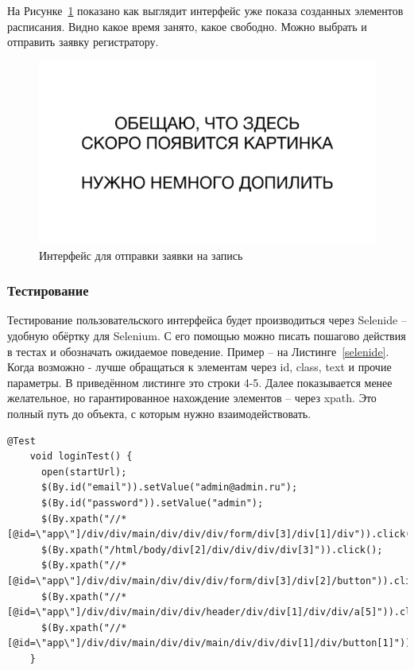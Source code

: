 \documentclass[a4paper,article]{article}
\begin{document}
\begin{sloppypar}
    \newpage
    
    На Рисунке~\ref{fig:dosched} показано как выглядит интерфейс уже показа созданных элементов расписания. Видно какое время занято, какое свободно. Можно выбрать и отправить заявку регистратору.
    
    \begin{figure}[h]
        \centering
        \includegraphics[width=0.8\linewidth]{UI. Доступное для записи время.png}        
        \caption{\centering Интерфейс для отправки заявки на запись}        
        \label{fig:dosched}
    \end{figure}

    \subsubsection{Тестирование}\label{Реализация. Клиентская часть. Тестирование}
    
    Тестирование пользовательского интерфейса будет производиться через Selenide -- удобную обёртку для Selenium. С его помощью можно писать пошагово действия в тестах и обозначать ожидаемое поведение. Пример -- на Листинге~\ref{selenide}. Когда возможно - лучше обращаться к элементам через id, class, text и прочие параметры. В приведённом листинге это строки 4-5. Далее показывается менее желательное, но гарантированное нахождение элементов -- через xpath. Это полный путь до объекта, с которым нужно взаимодействовать.
    
    \newpage
    
    \begin{lstlisting}[label=selenide,caption=Пример теста на Selenide]
    @Test
    void loginTest() {
      open(startUrl);
      $(By.id("email")).setValue("admin@admin.ru");
      $(By.id("password")).setValue("admin");
      $(By.xpath("//*[@id=\"app\"]/div/div/main/div/div/div/form/div[3]/div[1]/div")).click();
      $(By.xpath("/html/body/div[2]/div/div/div/div[3]")).click();
      $(By.xpath("//*[@id=\"app\"]/div/div/main/div/div/div/form/div[3]/div[2]/button")).click();
      $(By.xpath("//*[@id=\"app\"]/div/div/main/div/div/header/div/div[1]/div/div/a[5]")).click();
      $(By.xpath("//*[@id=\"app\"]/div/div/main/div/div/main/div/div/div[1]/div/button[1]")).shouldHave(text("СЗДТ"));
    }
    \end{lstlisting}
    

\end{sloppypar}
\end{document}
